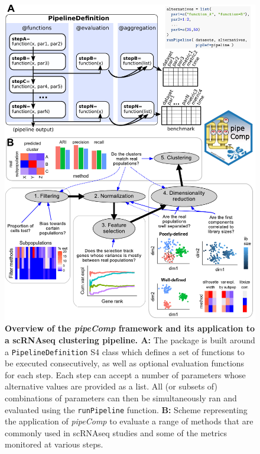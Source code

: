 \documentclass{bmcart}
\begin{document}
\begin{backmatter}
\begin{figure}
    \centering
    \ifshowfigs
    \includegraphics[scale=0.75, keepaspectratio]{main_figures/pipeline_explanation.pdf}
    \fi
    \caption{\textbf{Overview of the \textit{pipeComp} framework and its application to a scRNAseq clustering pipeline. A:} The package is built around a \texttt{PipelineDefinition} S4 class which defines a set of functions to be executed consecutively, as well as optional evaluation functions for each step. Each step can accept a number of parameters whose alternative values are provided as a list. All (or subsets of) combinations of parameters can then be simultaneously ran and evaluated using the \texttt{runPipeline} function. \textbf{B:} Scheme representing the application of \textit{pipeComp} to evaluate a range of methods that are commonly used in scRNAseq studies and some of the metrics monitored at various steps.}
    \label{fig:figure2}
\end{figure}



\end{backmatter}
\end{document}
